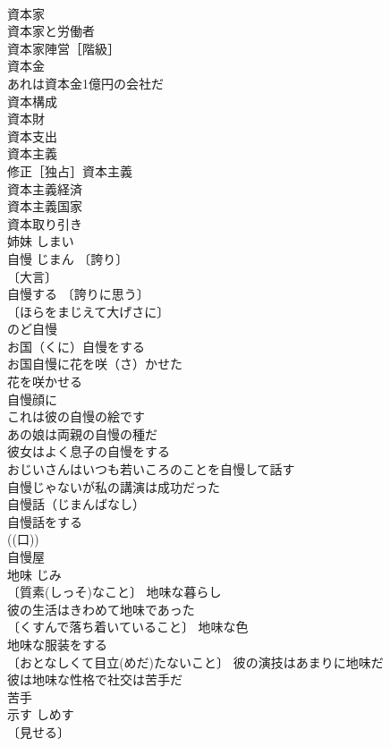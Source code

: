 \documentclass[8pt]{extreport}
\begin{document}
\begin{CJK}{UTF8}{min}
\\	資本家 
\\	資本家と労働者 
\\	資本家陣営［階級］ 
\\	資本金 
\\	あれは資本金1億円の会社だ 
\\	資本構成 
\\	資本財 
\\	資本支出 
\\	資本主義 
\\	修正［独占］資本主義 
\\	資本主義経済 
\\	資本主義国家 
\\	資本取り引き 
\\	姉妹	しまい	
\\	自慢	じまん	〔誇り〕
\\	〔大言〕
\\	自慢する 〔誇りに思う〕
\\	〔ほらをまじえて大げさに〕
\\	のど自慢 
\\	お国（くに）自慢をする 
\\	お国自慢に花を咲（さ）かせた 
\\	花を咲かせる 
\\	自慢顔に 
\\	これは彼の自慢の絵です 
\\	あの娘は両親の自慢の種だ 
\\	彼女はよく息子の自慢をする 
\\	おじいさんはいつも若いころのことを自慢して話す 
\\	自慢じゃないが私の講演は成功だった 
\\	自慢話（じまんばなし） 
\\	自慢話をする 
\\	((口)) 
\\	自慢屋 
\\	地味	じみ	
\\	〔質素(しっそ)なこと〕 地味な暮らし 
\\	彼の生活はきわめて地味であった 
\\	〔くすんで落ち着いていること〕 地味な色 
\\	地味な服装をする 
\\	〔おとなしくて目立(めだ)たないこと〕 彼の演技はあまりに地味だ 
\\	彼は地味な性格で社交は苦手だ 
\\	苦手 
\\	示す	しめす	
\\	〔見せる〕

\end{CJK}
\end{document}
